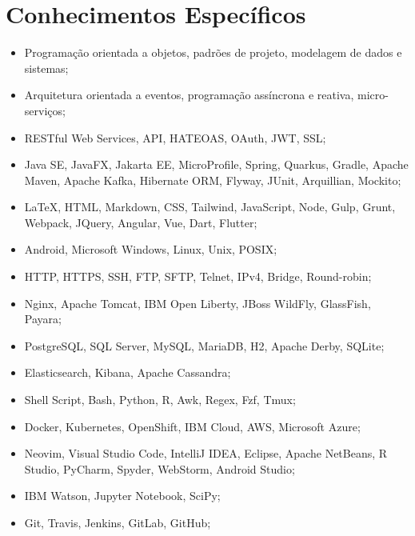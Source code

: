 \section{Conhecimentos Específicos}

\begin{itemize}
  \item Programação orientada a objetos, padrões de projeto, modelagem de dados
    e sistemas;
  \item Arquitetura orientada a eventos, programação assíncrona e reativa,
    micro-serviços;
  \item RESTful Web Services, API, HATEOAS, OAuth, JWT, SSL;
  \item Java SE, JavaFX, Jakarta EE, MicroProfile, Spring, Quarkus, Gradle,
    Apache Maven, Apache Kafka, Hibernate ORM, Flyway, JUnit, Arquillian,
    Mockito;
  \item {\LaTeX}, HTML, Markdown, CSS, Tailwind, JavaScript, Node, Gulp, Grunt,
    Webpack, JQuery, Angular, Vue, Dart, Flutter;
  \item Android, Microsoft Windows, Linux, Unix, POSIX;
  \item HTTP, HTTPS, SSH, FTP, SFTP, Telnet, IPv4, Bridge, Round-robin;
  \item Nginx, Apache Tomcat, IBM Open Liberty, JBoss WildFly, GlassFish,
    Payara;
  \item PostgreSQL, SQL Server, MySQL, MariaDB, H2, Apache Derby, SQLite;
  \item Elasticsearch, Kibana, Apache Cassandra;
  \item Shell Script, Bash, Python, R, Awk, Regex, Fzf, Tmux;
  \item Docker, Kubernetes, OpenShift, IBM Cloud, AWS, Microsoft Azure;
  \item Neovim, Visual Studio Code, IntelliJ IDEA, Eclipse, Apache NetBeans,
    R Studio, PyCharm, Spyder, WebStorm, Android Studio;
  \item IBM Watson, Jupyter Notebook, SciPy;
  \item Git, Travis, Jenkins, GitLab, GitHub;
\end{itemize}

